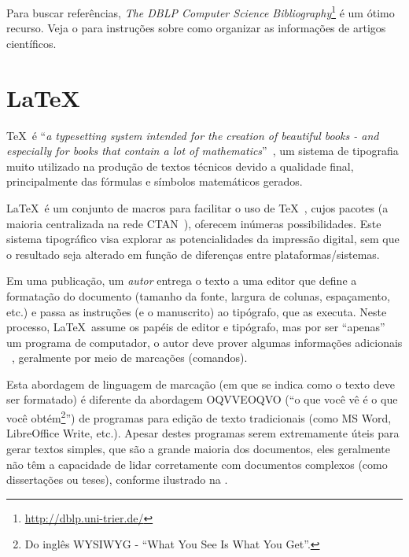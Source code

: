 Para buscar referências, \emph{The DBLP Computer Science Bibliography}\footnote{\url{http://dblp.uni-trier.de/}}
é um ótimo recurso. Veja o  para instruções
sobre como organizar as informações de artigos científicos.


\section{\LaTeX}%

\TeX\ é ``\emph{a typesetting system intended for the creation of beautiful books
 - and especially for books that contain a lot of mathematics}''~\cite{Knuth_1986_texbook},
 um sistema de tipografia muito utilizado na produção de textos técnicos devido
 a qualidade final, principalmente das fórmulas e símbolos matemáticos gerados.

\LaTeX\ é um conjunto de macros para facilitar o uso de \TeX~\cite{lamport_latex:_1994},
cujos pacotes (a maioria centralizada na rede \acrshort{CTAN}~\cite{greenwade93}), oferecem
inúmeras possibilidades. Este sistema tipográfico visa explorar as potencialidades
da impressão digital, sem que o resultado seja alterado em função de diferenças
entre plataformas/sistemas.

Em uma publicação, um \emph{autor} entrega o texto a uma editor que define a
formatação do documento (tamanho da fonte, largura de colunas, espaçamento, etc.)
e passa as instruções (e o manuscrito) ao tipógrafo, que as executa. Neste processo,
\LaTeX\ assume os papéis de editor e tipógrafo, mas por ser ``apenas'' um programa
de computador, o autor deve prover algumas informações adicionais ~\cite{Oetiker_1995_notsoshort},
geralmente por meio de marcações (comandos).

Esta abordagem de linguagem de marcação (em que se indica como o texto deve ser
formatado) é diferente da abordagem OQVVEOQVO (``o que você vê é o que você
obtém\footnote{Do inglês WYSIWYG - ``What You See Is What You Get''.}'') de programas
para edição de texto tradicionais (como MS Word, LibreOffice Write, etc.).
Apesar destes programas serem extremamente úteis para gerar textos simples, que
são a grande maioria dos documentos, eles geralmente não têm a capacidade de lidar
corretamente com documentos complexos (como dissertações ou teses), conforme ilustrado
na .%


